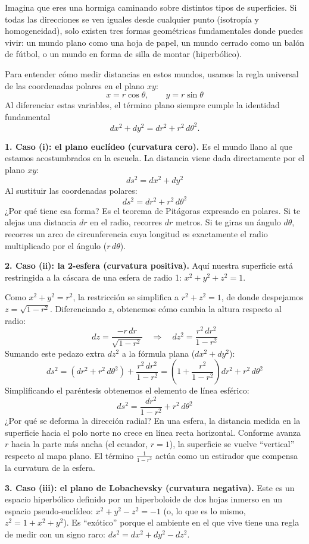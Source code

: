 \documentclass[11pt,a4paper]{article}
\begin{document}
Imagina que eres una hormiga caminando sobre distintos tipos de superficies. Si todas las direcciones se ven iguales desde cualquier punto (isotropía y homogeneidad), solo existen tres formas geométricas fundamentales donde puedes vivir: un mundo plano como una hoja de papel, un mundo cerrado como un balón de fútbol, o un mundo en forma de silla de montar (hiperbólico).

Para entender cómo medir distancias en estos mundos, usamos la regla universal de las coordenadas polares en el plano $xy$:
\[
x = r\cos\theta, \qquad y = r\sin\theta
\]
Al diferenciar estas variables, el término plano siempre cumple la identidad fundamental
\[
dx^2 + dy^2 = dr^2 + r^2\,d\theta^2.
\]

\noindent\textbf{1. Caso (i): el plano euclídeo (curvatura cero).} Es el mundo llano al que estamos acostumbrados en la escuela. La distancia viene dada directamente por el plano $xy$:
\[
ds^2 = dx^2 + dy^2
\]
Al sustituir las coordenadas polares:
\[
ds^2 = dr^2 + r^2\,d\theta^2
\]
¿Por qué tiene esa forma? Es el teorema de Pitágoras expresado en polares. Si te alejas una distancia $dr$ en el radio, recorres $dr$ metros. Si te giras un ángulo $d\theta$, recorres un arco de circunferencia cuya longitud es exactamente el radio multiplicado por el ángulo ($r\,d\theta$).

\noindent\textbf{2. Caso (ii): la 2-esfera (curvatura positiva).} Aquí nuestra superficie está restringida a la cáscara de una esfera de radio 1: $x^2+y^2+z^2=1$.

Como $x^2+y^2=r^2$, la restricción se simplifica a $r^2+z^2=1$, de donde despejamos $z=\sqrt{1-r^2}$. Diferenciando $z$, obtenemos cómo cambia la altura respecto al radio:
\[
dz = \frac{-r\,dr}{\sqrt{1-r^2}} \quad\Longrightarrow\quad dz^2 = \frac{r^2\,dr^2}{1-r^2}
\]
Sumando este pedazo extra $dz^2$ a la fórmula plana ($dx^2+dy^2$):
\[
ds^2 = (dr^2 + r^2\,d\theta^2) + \frac{r^2\,dr^2}{1-r^2} = \left(1 + \frac{r^2}{1-r^2}\right)dr^2 + r^2\,d\theta^2
\]
Simplificando el paréntesis obtenemos el elemento de línea esférico:
\[
ds^2 = \frac{dr^2}{1-r^2} + r^2\,d\theta^2
\]
¿Por qué se deforma la dirección radial? En una esfera, la distancia medida en la superficie hacia el polo norte no crece en línea recta horizontal. Conforme avanza $r$ hacia la parte más ancha (el ecuador, $r=1$), la superficie se vuelve ``vertical'' respecto al mapa plano. El término $\frac{1}{1-r^2}$ actúa como un estirador que compensa la curvatura de la esfera.

\noindent\textbf{3. Caso (iii): el plano de Lobachevsky (curvatura negativa).} Este es un espacio hiperbólico definido por un hiperboloide de dos hojas inmerso en un espacio pseudo-euclídeo: $x^2+y^2-z^2=-1$ (o, lo que es lo mismo, $z^2=1+x^2+y^2$). Es ``exótico'' porque el ambiente en el que vive tiene una regla de medir con un signo raro: $ds^2 = dx^2+dy^2-dz^2$.
\end{document}
